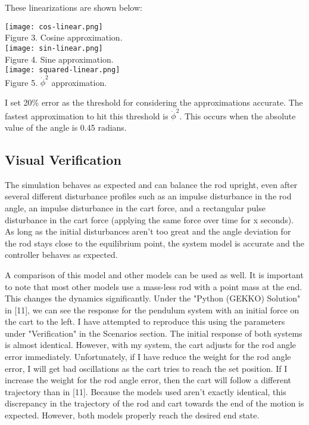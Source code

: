\documentclass{article}
\begin{document}
\noindent These linearizations are shown below:
\vspace{5mm}

\begin{center}
    \texttt{[image: cos-linear.png]}\\
    Figure 3. Cosine approximation. \\
    \texttt{[image: sin-linear.png]} \\
    Figure 4. Sine approximation. \\
        \vspace{8mm}
    \texttt{[image: squared-linear.png]} \\
    Figure 5. $\Dot{\phi}^2$ approximation. \\
\end{center}

I set 20\% error as the threshold for considering the approximations accurate. The fastest approximation to hit this threshold is  $\Dot{\phi}^2$. This occurs when the absolute value of the angle is 0.45 radians.

\subsection{Visual Verification}

The simulation behaves as expected and can balance the rod upright, even after several different disturbance profiles such as an impulse disturbance in the rod angle, an impulse disturbance in the cart force, and a rectangular pulse disturbance in the cart force (applying the same force over time for x seconds). As long as the initial disturbances aren't too great and the angle deviation for the rod stays close to the equilibrium point, the system model is accurate and the controller behaves as expected.

A comparison of this model and other models can be used as well. It is important to note that most other models use a mass-less rod with a point mass at the end. This changes the dynamics significantly. Under the "Python (GEKKO) Solution" in [11], we can see the response for the pendulum system with an initial force on the cart to the left. I have attempted to reproduce this using the parameters under "Verification" in the Scenarios section. The initial response of both systems is almost identical. However, with my system, the cart adjusts for the rod angle error immediately. Unfortunately, if I have reduce the weight for the rod angle error, I will get bad oscillations as the cart tries to reach the set position. If I increase the weight for the rod angle error, then the cart will follow a different trajectory than in [11]. Because the models used aren't exactly identical, this discrepancy in the trajectory of the rod and cart towards the end of the motion is expected. However, both models properly reach the desired end state.
\end{document}

